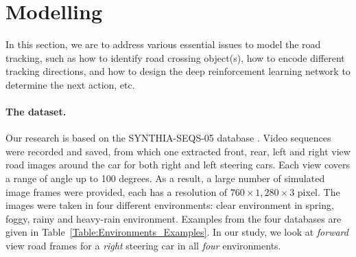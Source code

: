 \documentclass{svproc}
\begin{document}
 


\section{Modelling}
In this section, we are to address various essential issues to model the road tracking, such as how to identify road crossing object(s), how to encode different tracking directions, and how to design the deep reinforcement learning network to determine the next action, etc. 


\paragraph{The dataset.} Our research is based on the SYNTHIA-SEQS-05 database \cite{Ros2016TheSYNTHIA}. Video sequences were recorded and saved, from which one extracted front, rear, left and right view road images around the car for both right and left steering cars. Each view covers a range of angle up to 100 degrees. As a result, a large number of simulated image frames were provided, each has a resolution of $760 \times 1,280 \times 3$ pixel. The images were taken in four different environments: clear environment in spring, foggy, rainy and heavy-rain  environment. Examples from the four databases are given in Table~\ref{Table:Environments_Examples}.	In our study, we look at \emph{forward} view road frames for a \emph{right} steering car in all \emph{four} environments. 
\end{document}
